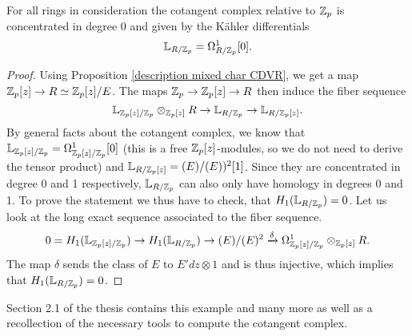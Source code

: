 \begin{lem}
    For all rings in consideration the cotangent complex relative to $\mathbb{Z}_p$ is concentrated in degree 0 and given by the Kähler differentials
    \begin{equation*}
        \mathbb{L}_{R/\mathbb{Z}_p}=\Omega^1_{R/\mathbb{Z}_p}[0].
    \end{equation*}
\end{lem}
\begin{proof}
    Using Proposition \ref{description mixed char CDVR}, we get a map $\mathbb{Z}_p[z]\to R\simeq \mathbb{Z}_p[z]/E$. 
    The maps $\mathbb{Z}_p\to \mathbb{Z}_p[z]\to R$ then induce the fiber sequence
    \begin{equation*}
        \mathbb{L}_{\mathbb{Z}_p[z]/\mathbb{Z}_p}\otimes_{\mathbb{Z}_p[z]}R\to \mathbb{L}_{R/\mathbb{Z}_p}\to \mathbb{L}_{R/\mathbb{Z}_p[z]}.
    \end{equation*}
    By general facts about the cotangent complex, we know that $\mathbb{L}_{\mathbb{Z}_p[z]/\mathbb{Z}_p}=\Omega^1_{\mathbb{Z}_p[z]/\mathbb{Z}_p}[0]$ (this is a free $\mathbb{Z}_p[z]$-modules, so we do not need to derive the tensor product) and $\mathbb{L}_{R/\mathbb{Z}_p[z]}=(E)/(E))^2[1]$.
    Since they are concentrated in degree 0 and 1 respectively, $\mathbb{L}_{R/\mathbb{Z}_p}$ can also only have homology in degrees 0 and 1. To prove the statement we thus have to check, that $H_1(\mathbb{L}_{R/\mathbb{Z}_p})=0$. Let us look at the long exact sequence associated to the fiber sequence.
    \begin{equation*}
        0=H_1(\mathbb{L}_{\mathbb{Z}_p[z]/\mathbb{Z}_p})\to H_1(\mathbb{L}_{R/\mathbb{Z}_p})\to (E)/(E)^2 \xrightarrow{\delta} \Omega^1_{\mathbb{Z}_p[z]/\mathbb{Z}_p}\otimes_{\mathbb{Z}_p[z]}R.
    \end{equation*} 
    The map $\delta$ sends the class of $E$ to $E'dz\otimes 1$ and is thus injective, which implies that $H_1(\mathbb{L}_{R/\mathbb{Z}_p})=0$.
\end{proof}
Section 2.1 of the thesis \cite{OnderiveddeRhamcohomoology} contains this example and many more as well as a recollection of the necessary tools to compute the cotangent complex.

